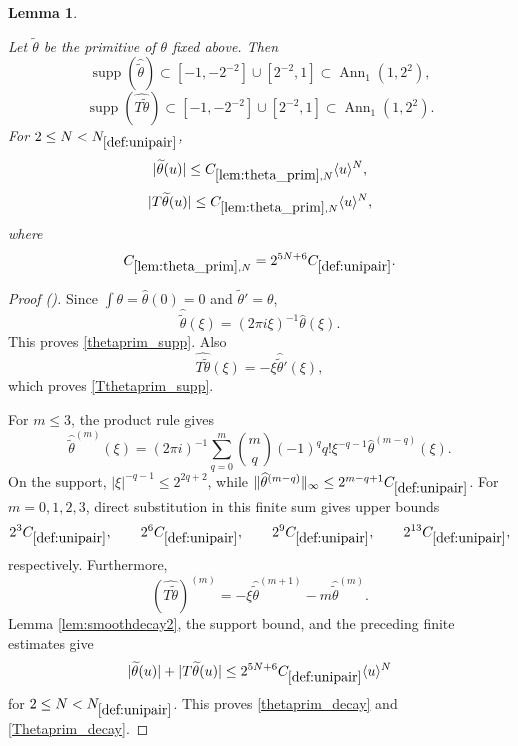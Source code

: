 \documentclass[12pt,reqno]{amsart}
\newcommand{\auto}{{({\tiny\faCar})}}
\theoremstyle{plain}
\newtheorem{lemma}[theorem]{Lemma}
\numberwithin{equation}{section}
\theoremstyle{remark}
\newcommand{\uses}[1]{}
\newcommand{\usesdefs}[1]{}
\newcommand{\leanok}{}
\newcommand{\lean}[1]{}
\begin{document}
\begin{lemma}\label{lem:theta_prim}\uses{lem:smoothdecay2}\usesdefs{bracket bump,def:cn-window,def:unipair,defn:window based bump functions}
\lean{Auto.thetaPrimitive}
\leanok
Let $\widetilde\theta$ be the primitive of $\theta$ fixed above. Then
\begin{equation}\label{thetaprim_supp}
\operatorname{supp}(\widehat{\widetilde\theta})
\subset[-1,-2^{-2}]\cup[2^{-2},1]
\subset\operatorname{Ann}_1(1,2^2),
\end{equation}
\begin{equation}\label{Tthetaprim_supp}
\operatorname{supp}(\widehat{T\widetilde\theta})
\subset[-1,-2^{-2}]\cup[2^{-2},1]
\subset\operatorname{Ann}_1(1,2^2).
\end{equation}
For $2\le N<N_{\ref{def:unipair}}$,
\begin{equation}\label{thetaprim_decay}
|\widetilde\theta(u)|
\le C_{\ref{lem:theta_prim},N}\langle u\rangle^N,
\end{equation}
\begin{equation}\label{Thetaprim_decay}
|T\widetilde\theta(u)|
\le C_{\ref{lem:theta_prim},N}\langle u\rangle^N,
\end{equation}
where
\begin{equation}\label{auto:theta-primitive-constant-definition}
C_{\ref{lem:theta_prim},N}
=2^{5N+6}C_{\ref{def:unipair}}.
\end{equation}
\end{lemma}
\begin{proof}[Proof \auto]
Since $\int\theta=\widehat\theta(0)=0$ and $\widetilde\theta'=\theta$,
\[
\widehat{\widetilde\theta}(\xi)=(2\pi i\xi)^{-1}\widehat\theta(\xi).
\]
This proves \eqref{thetaprim_supp}. Also
\[
\widehat{T\widetilde\theta}(\xi)
=-\xi\widehat{\widetilde\theta}'(\xi),
\]
which proves \eqref{Tthetaprim_supp}.

For $m\le3$, the product rule gives
\[
\widehat{\widetilde\theta}^{(m)}(\xi)
=(2\pi i)^{-1}
\sum_{q=0}^m\binom{m}{q}(-1)^q q!\xi^{-q-1}
\widehat\theta^{(m-q)}(\xi).
\]
On the support, $|\xi|^{-q-1}\le2^{2q+2}$, while
$\|\widehat\theta^{(m-q)}\|_\infty\le2^{m-q+1}C_{\ref{def:unipair}}$. For $m=0,1,2,3$, direct substitution in this finite sum gives upper bounds
\[
2^3C_{\ref{def:unipair}},
\qquad
2^6C_{\ref{def:unipair}},
\qquad
2^9C_{\ref{def:unipair}},
\qquad
2^{13}C_{\ref{def:unipair}},
\]
respectively. Furthermore,
\[
(\widehat{T\widetilde\theta})^{(m)}
=-\xi\widehat{\widetilde\theta}^{(m+1)}
-m\widehat{\widetilde\theta}^{(m)}.
\]
Lemma \ref{lem:smoothdecay2}, the support bound, and the preceding finite estimates give
\[
|\widetilde\theta(u)|+|T\widetilde\theta(u)|
\le2^{5N+6}C_{\ref{def:unipair}}\langle u\rangle^N
\]
for $2\le N<N_{\ref{def:unipair}}$. This proves \eqref{thetaprim_decay} and \eqref{Thetaprim_decay}.
\end{proof}
\end{document}
